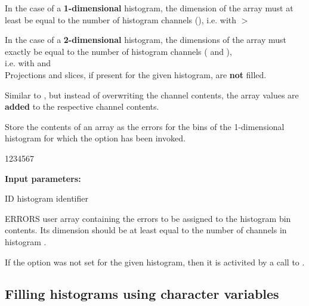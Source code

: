 \Remark
 
\begin{UL}
\item In the case of a {\bf 1-dimensional} histogram, the dimension
      of the array must at least be equal to the number of
      histogram channels (), i.e.
       with $>$
\item In the case of a {\bf 2-dimensional} histogram, the dimensions
      of the array must exactly be equal to the number of
      histogram channels ( and ), \\
      i.e.  with  and 
      \\
      Projections and slices, if present for the given histogram,
      are {\bf not} filled.
\end{UL}
 
 
 
\Action 
Similar to , but instead of overwriting the
channel contents, the array values are {\bf added} to the
respective channel contents.
 
 
 
\Action 
Store the contents of an array 
as the errors for the bins of the 1-dimensional histogram for
which the option  has been invoked.
 
\begin{DLtt}{1234567}
\item[{\rm\bf Input parameters:}]
\item[ID] histogram identifier
\item[ERRORS] user array containing the errors to be assigned to the
       histogram bin contents. Its dimension should be at least equal to
       the number of channels in histogram .
\end{DLtt}
 
\Remark
 
If the  option was not set for the given histogram, then
it is activited by a call to .

\newpage%

\subsection{Filling histograms using character variables}

